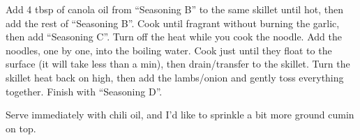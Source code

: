 \documentclass[]{article}
\begin{document}
Add 4 tbsp of canola oil from ``Seasoning B'' to the same skillet until hot, then add the rest of ``Seasoning B''. Cook until fragrant without burning the garlic, then add ``Seasoning C''. Turn off the heat while you cook the noodle. Add the noodles, one by one, into the boiling water. Cook just until they float to the surface (it will take less than a min), then drain/transfer to the skillet. Turn the skillet heat back on high, then add the lambs/onion and gently toss everything together. Finish with ``Seasoning D''.

Serve immediately with chili oil, and I'd like to sprinkle a bit more ground cumin on top.



\printindex
\end{document}
